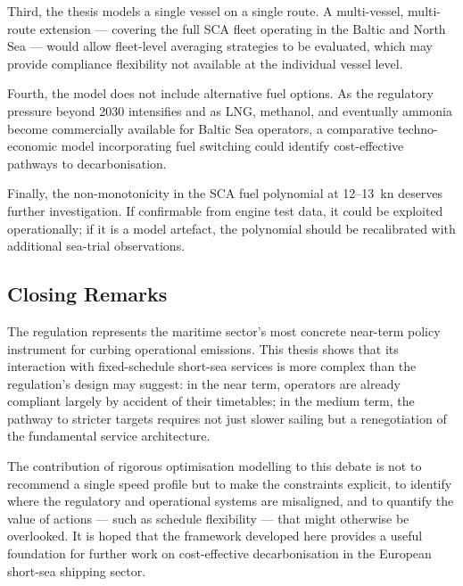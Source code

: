 Third, the thesis models a single vessel on a single route.  A
multi-vessel, multi-route extension --- covering the full SCA fleet
operating in the Baltic and North Sea --- would allow fleet-level
\CII{} averaging strategies to be evaluated, which may provide
compliance flexibility not available at the individual vessel level.

Fourth, the model does not include alternative fuel options.  As the
regulatory pressure beyond 2030 intensifies and as LNG, methanol, and
eventually ammonia become commercially available for Baltic Sea
operators, a comparative techno-economic model incorporating fuel
switching could identify cost-effective pathways to decarbonisation.

Finally, the non-monotonicity in the SCA fuel polynomial at 12--13~kn
deserves further investigation.  If confirmable from engine test data,
it could be exploited operationally; if it is a model artefact, the
polynomial should be recalibrated with additional sea-trial observations.

\subsection{Closing Remarks}
\label{sec:conc:closing}

The \CII{} regulation represents the maritime sector's most concrete
near-term policy instrument for curbing operational emissions.  This
thesis shows that its interaction with fixed-schedule short-sea services
is more complex than the regulation's design may suggest: in the near
term, operators are already compliant largely by accident of their
timetables; in the medium term, the pathway to stricter targets requires
not just slower sailing but a renegotiation of the fundamental service
architecture.

The contribution of rigorous optimisation modelling to this debate is
not to recommend a single speed profile but to make the constraints
explicit, to identify where the regulatory and operational systems are
misaligned, and to quantify the value of actions --- such as schedule
flexibility --- that might otherwise be overlooked.  It is hoped that
the framework developed here provides a useful foundation for further
work on cost-effective decarbonisation in the European short-sea shipping
sector.
